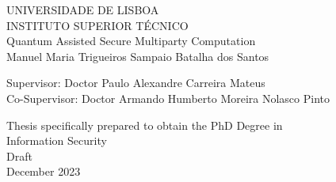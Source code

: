 \begin{center}
\vspace{0.5cm}
{\FontLb UNIVERSIDADE DE LISBOA} \\
\vspace{0.2cm}
{\FontLb INSTITUTO SUPERIOR T\'{E}CNICO} \\


\vspace{5.0cm}
{\FontHb 
Quantum Assisted Secure Multiparty Computation} \\

\vspace{3cm}
{\FontLn Manuel Maria Trigueiros Sampaio Batalha dos Santos} \\
\vspace{2cm}

\end{center}
\begin{flushleft}


{\FontMb Supervisor: \FontMn \qquad Doctor Paulo Alexandre Carreira Mateus} \\
{\FontMb Co-Supervisor: \FontMn \hspace{.0em} Doctor Armando Humberto Moreira Nolasco Pinto} \\

\vspace{2.5cm}

\end{flushleft}
\begin{center}

{\FontMn Thesis specifically prepared to obtain the PhD Degree in} \\
{\FontMn Information Security} \\
\vspace{1cm}
{\FontLn Draft} \\
\vspace{1cm}
{\FontMb December 2023} \\
%
\end{center}

\cleardoublepage
